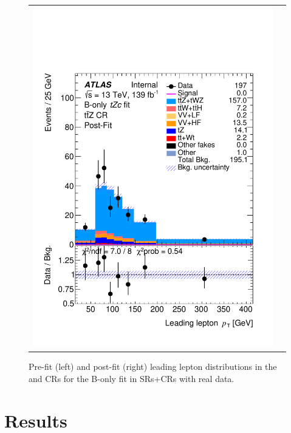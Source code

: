 \begin{figure}[htbp]
\begin{tabular}{cc}
		\includegraphics[width=.45\textwidth]{Chapters/CH8/figures/BONLY_CRSR_DL1rc_unblind/Plots/TTZCR_postFit} \\
	\end{tabular}
	\caption{Pre-fit (left) and post-fit (right) leading lepton \pt distributions in the \ttbar and \ttZ CRs for the B-only \tZc fit in SRs+CRs with real data.
		\ErrStatSys
	}%
	\label{fig:stat:tzc:splusb:crsr:crplots:2_unb}
\end{figure}

\clearpage
\section{Results}
\label{sec:stat:tzc}
